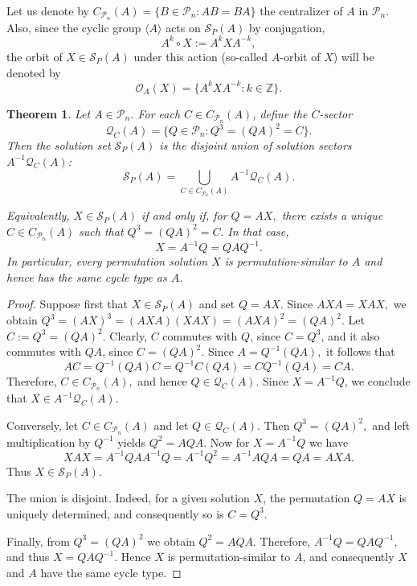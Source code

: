 \documentclass{article}
\newtheorem{theorem}{Theorem}[section]
\theoremstyle{definition}\newtheorem{example}{Example}[section]
\def\S{{\mathcal{S}}}
\def\Q{{\mathcal{Q}}}
\def\P{{\mathcal{P}}}
\begin{document}
	Let us denote by $C_{\P_n}(A)=\{B\in \P_n:AB=BA\}$ the centralizer of $A$ in $\P_n$. Also, since the cyclic group $\langle A\rangle$ acts on $\mathcal S_P(A)$ by conjugation, $$A^k\circ X:=A^kXA^{-k},$$ 
	the orbit of $X\in\mathcal S_P(A)$ under this action (so-called $A$-orbit of $X$) will be denoted by
	$$
	\mathcal O_A(X)=\{A^kXA^{-k}:k\in\mathbb Z\}.
	$$
	

	
	\begin{theorem}\label{Centralizer_decomposition}
		Let $A\in \P_n$. For each $C\in C_{\P_n}(A)$, define the $C$-sector
		$$
		\mathcal Q_C(A)=\{Q\in \P_n:Q^3=(QA)^2=C\}.
		$$
		Then the solution set $\S_P(A)$ is the disjoint union of solution sectors $A^{-1}\Q_C(A)$:
		$$
		\mathcal S_P(A)=\bigcup_{C\in C_{\P_n}(A)}A^{-1}\mathcal Q_C(A).
		$$
		
		Equivalently, $X\in\mathcal S_P(A)$ if and only if, for $Q=AX,$
		there exists a unique $C\in C_{\P_n}(A)$ such that $Q^3=(QA)^2=C.$
		In that case,
		$$
		X=A^{-1}Q=QAQ^{-1}.
		$$
		In particular, every permutation solution $X$ is permutation-similar to $A$ and hence has the same cycle type as $A$.
	\end{theorem}
	
	\begin{proof}
		Suppose first that $X\in\mathcal S_P(A)$ and set $Q=AX.$ Since $AXA=XAX,$
		we obtain $Q^3=(AX)^3=(AXA)(XAX)=(AXA)^2=(QA)^2.$ Let $C:=Q^3=(QA)^2.$
		Clearly, $C$ commutes with $Q$, since $C=Q^3$, and it also commutes with
		$QA$, since $C=(QA)^2$. Since $A=Q^{-1}(QA),$ it follows that
		$$
		AC=Q^{-1}(QA)C=Q^{-1}C(QA)=CQ^{-1}(QA)=CA.
		$$
		Therefore, $C\in C_{\P_n}(A),$ and hence $Q\in\mathcal Q_C(A).$
		Since $X=A^{-1}Q$, we conclude that $X\in A^{-1}\mathcal Q_C(A).$
		
		Conversely, let $C\in C_{\P_n}(A)$ and let $Q\in\mathcal Q_C(A).$
		Then $Q^3=(QA)^2,$ and left multiplication by $Q^{-1}$ yields $Q^2=AQA$.
		Now for $X=A^{-1}Q$ we have
		$$
		XAX=A^{-1}QAA^{-1}Q=A^{-1}Q^2=A^{-1}AQA=QA=AXA.$$
		Thus $X\in\mathcal S_P(A)$.
		
		The union is disjoint. Indeed, for a given solution $X$, the permutation
		$Q=AX$ is uniquely determined, and consequently so is $C=Q^3.$
		
		Finally, from $Q^3=(QA)^2$ we obtain $Q^2=AQA.$ Therefore, $A^{-1}Q=QAQ^{-1},$
		and thus $X=QAQ^{-1}.$ Hence $X$ is permutation-similar to $A$, and consequently $X$ and $A$ have the same cycle type.
	\end{proof}
	
\end{document}
